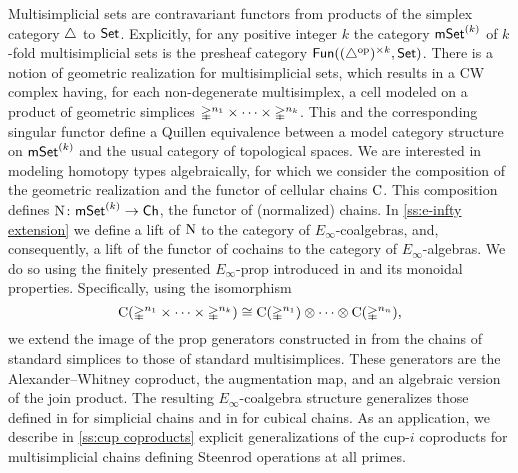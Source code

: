 Multisimplicial sets are contravariant functors from products of the simplex category $\triangle$ to $\mathsf{Set}$.
Explicitly, for any positive integer $k$ the category $\mathsf{mSet}^{(k)}$ of $k$-fold multisimplicial sets is the presheaf category $\mathsf{Fun}((\triangle^{\mathrm{op}})^{\times k}, \mathsf{Set})$.
There is a notion of geometric realization for multisimplicial sets, which results in a CW complex having, for each non-degenerate multisimplex, a cell modeled on a product of geometric simplices $\mathbb{\Delta}^{n_1}\times\dots\times\mathbb{\Delta}^{n_k}$.
This and the corresponding singular functor define a Quillen equivalence between a model category structure on $\mathsf{mSet}^{(k)}$ and the usual category of topological spaces.
We are interested in modeling homotopy types algebraically, for which we consider the composition of the geometric realization and the functor of cellular chains $\operatorname{C}$.
This composition defines $\operatorname{N} \colon \mathsf{mSet}^{(k)} \to \mathsf{Ch}$, the functor of (normalized) chains.
In \cref{ss:e-infty extension} we define a lift of $\operatorname{N}$ to the category of $E_\infty$-coalgebras, and, consequently, a lift of the functor of cochains to the category of $E_\infty$-algebras.
We do so using the finitely presented $E_\infty$-prop introduced in \cite{medina2020prop1} and its monoidal properties.
Specifically, using the isomorphism
\[
\operatorname{C}(\mathbb{\Delta}^{n_1}\times\dots\times\mathbb{\Delta}^{n_k}) \cong
\operatorname{C}(\mathbb{\Delta}^{n_1}) \otimes\dotsb\otimes \operatorname{C}(\mathbb{\Delta}^{n_n}),
\]
we extend the image of the prop generators constructed in \cite{medina2020prop1} from the chains of standard simplices to those of standard multisimplices.
These generators are the Alexander--Whitney coproduct, the augmentation map, and an algebraic version of the join product.
The resulting $E_\infty$-coalgebra structure generalizes those defined in \cite{mcclure2003multivariable, berger2004combinatorial, medina2020prop1} for simplicial chains and in \cite{medina2022cube_einfty} for cubical chains.
As an application, we describe in \cref{ss:cup coproducts} explicit generalizations of the cup-$i$ coproducts for multisimplicial chains defining Steenrod operations at all primes.


